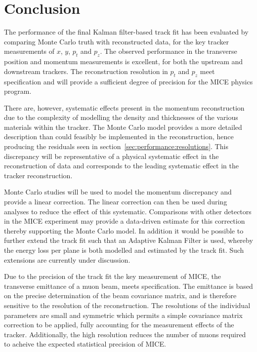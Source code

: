 \section{Conclusion}
\label{sec:Conclusion}

The performance of the final Kalman filter-based track fit has been evaluated by comparing Monte Carlo truth with reconstructed data, for the key tracker measurements of $x$, $y$, $p_{t}$ and $p_z$.  The observed performance in the transverse position and momentum measurements is excellent, for both the upstream and downstream trackers. The reconstruction resolution in $p_t$ and $p_z$ meet specification and will provide a sufficient degree of precision for the MICE physics program.

There are, however, systematic effects present in the momentum reconstruction due to the complexity of modelling the density and thicknesses of the various materials within the tracker. The Monte Carlo model provides a more detailed description than could feasibly be implemented in the reconstruction, hence producing the residuals seen in section~\ref{sec:performance:resolutions}. This discrepancy will be representative of a physical systematic effect in the reconstruction of data and corresponds to the leading systematic effect in the tracker reconstruction.

Monte Carlo studies will be used to model the momentum discrepancy and provide a linear correction. The linear correction can then be used during analyses to reduce the effect of this systematic. Comparisons with other detectors in the MICE experiment may provide a data-driven estimate for this correction thereby supporting the Monte Carlo model. In addition it would be possible to further extend the track fit such that an Adaptive Kalman Filter is used, whereby the energy loss per plane is both modelled and estimated by the track fit. Such extensions are currently under discussion.

Due to the precision of the track fit the key measurement of MICE, the transverse emittance of a muon beam, meets specification. The emittance is based on the precise determination of the beam covariance matrix, and is therefore sensitive to the resolution of the reconstruction. The resolutions of the individual parameters are small and symmetric which permits a simple covariance matrix correction to be applied, fully accounting for the measurement effects of the tracker. Additionally, the high resolution reduces the number of muons required to acheive the expected statistical precision of MICE.

